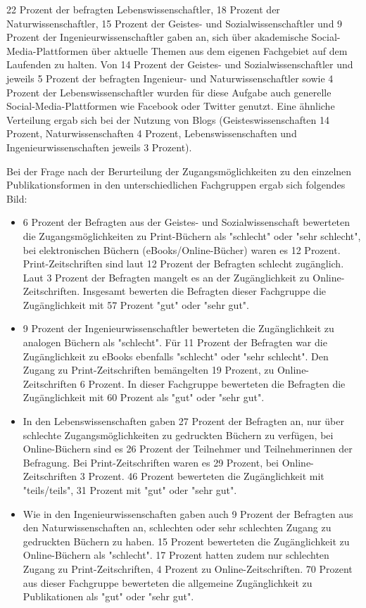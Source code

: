 22 Prozent der befragten Lebenswissenschaftler, 18 Prozent der Naturwissenschaftler, 15 Prozent der Geistes- und Sozialwissenschaftler und 9 Prozent der Ingenieurwissenschaftler gaben an, sich über akademische Social-Media-Plattformen über aktuelle Themen aus dem eigenen Fachgebiet auf dem Laufenden zu halten. Von 14 Prozent der Geistes- und Sozialwissenschaftler und jeweils 5 Prozent der befragten Ingenieur- und Naturwissenschaftler sowie 4 Prozent der Lebenswissenschaftler wurden für diese Aufgabe auch generelle Social-Media-Plattformen wie Facebook oder Twitter genutzt. Eine ähnliche Verteilung ergab sich bei der Nutzung von Blogs (Geisteswissenschaften 14 Prozent, Naturwissenschaften 4 Prozent, Lebenswissenschaften und Ingenieurwissenschaften jeweils 3 Prozent).

Bei der Frage nach der Berurteilung der Zugangsmöglichkeiten zu den einzelnen Publikationsformen in den unterschiedlichen Fachgruppen ergab sich folgendes Bild:
\begin{itemize}
\item 6 Prozent der Befragten aus der Geistes- und Sozialwissenschaft bewerteten die Zugangsmöglichkeiten zu Print-Büchern als "schlecht" oder "sehr schlecht", bei elektronischen Büchern (eBooks/Online-Bücher) waren es 12 Prozent. Print-Zeitschriften sind laut 12 Prozent der Befragten schlecht zugänglich. Laut 3 Prozent der Befragten mangelt es an der Zugänglichkeit zu Online-Zeitschriften. Insgesamt bewerten die Befragten dieser Fachgruppe die Zugänglichkeit mit 57 Prozent "gut" oder "sehr gut".
\item 9 Prozent der Ingenieurwissenschaftler bewerteten die Zugänglichkeit zu analogen Büchern als "schlecht". Für 11 Prozent der Befragten war die Zugänglichkeit zu eBooks ebenfalls "schlecht" oder "sehr schlecht". Den Zugang zu Print-Zeitschriften bemängelten 19 Prozent, zu Online-Zeitschriften 6 Prozent. In dieser Fachgruppe bewerteten die Befragten die Zugänglichkeit mit 60 Prozent als "gut" oder "sehr gut".
\item In den Lebenswissenschaften gaben 27 Prozent der Befragten an, nur über schlechte Zugangsmöglichkeiten zu gedruckten Büchern zu verfügen, bei Online-Büchern sind es 26 Prozent der Teilnehmer und Teilnehmerinnen der Befragung. Bei Print-Zeitschriften waren es 29 Prozent, bei Online-Zeitschriften 3 Prozent. 46 Prozent bewerteten die Zugänglichkeit mit "teils/teils", 31 Prozent mit "gut" oder "sehr gut".
\item Wie in den Ingenieurwissenschaften gaben auch 9 Prozent der Befragten aus den Naturwissenschaften an, schlechten oder sehr schlechten Zugang zu gedruckten Büchern zu haben. 15 Prozent bewerteten die Zugänglichkeit zu Online-Büchern als "schlecht". 17 Prozent hatten zudem nur schlechten Zugang zu Print-Zeitschriften, 4 Prozent zu Online-Zeitschriften. 70 Prozent aus dieser Fachgruppe bewerteten die allgemeine Zugänglichkeit zu Publikationen als "gut" oder "sehr gut".
\end{itemize}

